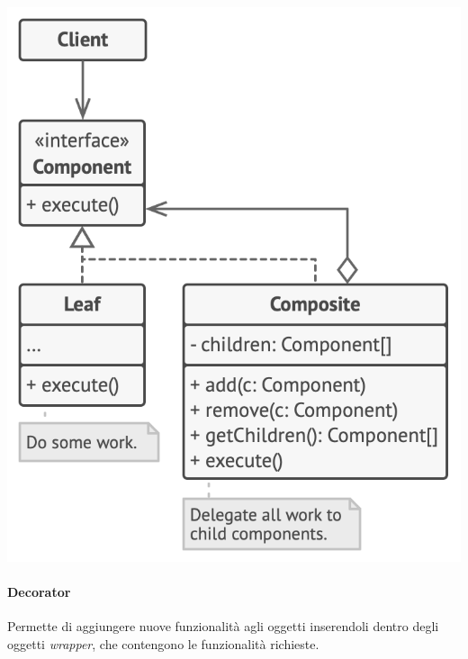 \documentclass{article}
\begin{document}
            \paragraph{}\includegraphics[scale=0.25]{./img/composite.png}
            
            \paragraph{Decorator} Permette di aggiungere nuove funzionalità agli oggetti inserendoli dentro degli oggetti \textit{wrapper}, che contengono le funzionalità richieste.
\end{document}
